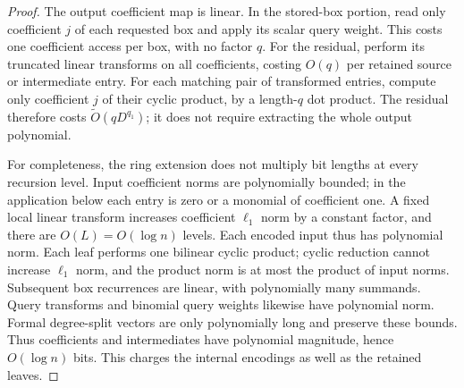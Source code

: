 \documentclass[11pt]{article}
\newcommand{\softO}{\widetilde O}
\begin{document}
\begin{proof}
The output coefficient map is linear. In the stored-box portion, read
only coefficient $j$ of each requested box and apply its scalar query
weight. This costs one coefficient access per box, with no factor $q$.
For the residual, perform its truncated linear transforms on all
coefficients, costing $O(q)$ per retained source or intermediate entry.
For each matching pair of transformed entries, compute only coefficient
$j$ of their cyclic product, by a length-$q$ dot product. The residual
therefore costs $\softO(qD^{q_1})$; it does not require extracting the
whole output polynomial.

For completeness, the ring extension does not multiply bit lengths at
every recursion level. Input coefficient norms are polynomially bounded; in the application
below each entry is zero or a monomial of coefficient one. A fixed local linear transform increases coefficient
$\ell_1$ norm by a constant factor, and there are $O(L)=O(\log n)$
levels. Each encoded input thus has polynomial norm. Each leaf performs
one bilinear cyclic product; cyclic reduction cannot increase
$\ell_1$ norm, and the product norm is at most the product of input
norms. Subsequent box recurrences are linear, with polynomially many
summands. Query transforms and binomial query weights likewise have
polynomial norm. Formal degree-split vectors are only polynomially long
and preserve these bounds. Thus coefficients and intermediates have
polynomial magnitude, hence $O(\log n)$ bits. This charges the internal
encodings as well as the retained leaves.
\end{proof}
\end{document}
